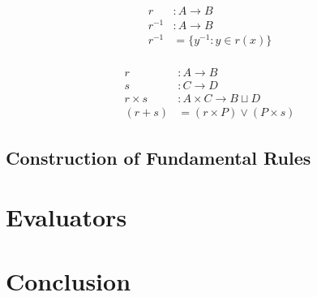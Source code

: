 \documentclass{article}
\theoremstyle{definition}
\theoremstyle{plain}
\begin{document}
\begin{align*}
                   r & : A \rightarrow B \\
              r^{-1} & : A \rightarrow B \\
              r^{-1} & = \{ y^{-1} : y \in r (x) \} \\
\end{align*}

\begin{align*}
              r & : A \rightarrow B \\
              s & : C \rightarrow D \\
     r \times s & : A \times C \rightarrow B \sqcup D \\
             (r + s) & = (r \times P) \vee (P \times s)
\end{align*}

\subsection{Construction of Fundamental Rules}

\section{Evaluators}

\section{Conclusion}
\end{document}
